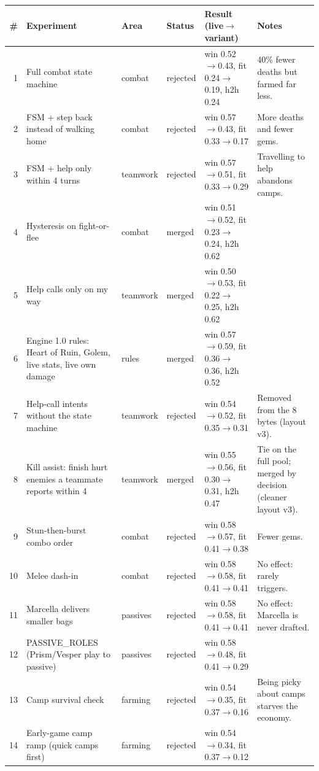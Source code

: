 \begin{xltabular}{\linewidth}{@{}rp{3.2cm}lp{1.3cm}p{4.3cm}X@{}}
\toprule
\# & Experiment & Area & Status & Result (live$\to$variant) & Notes\\
\midrule
{} & Full combat state machine & combat & rejected & win 0.52$\to$0.43, fit 0.24$\to$0.19, h2h 0.24 & 40\% fewer deaths but farmed far less.\\
2 & FSM + step back instead of walking home & combat & rejected & win 0.57$\to$0.43, fit 0.33$\to$0.17 & More deaths and fewer gems.\\
3 & FSM + help only within 4 turns & teamwork & rejected & win 0.57$\to$0.51, fit 0.33$\to$0.29 & Travelling to help abandons camps.\\
4 & Hysteresis on fight-or-flee & combat & merged & win 0.51$\to$0.52, fit 0.23$\to$0.24, h2h 0.62 & \\
5 & Help calls only on my way & teamwork & merged & win 0.50$\to$0.53, fit 0.22$\to$0.25, h2h 0.62 & \\
6 & Engine 1.0 rules: Heart of Ruin, Golem, live stats, live own damage & rules & merged & win 0.57$\to$0.59, fit 0.36$\to$0.36, h2h 0.52 & \\
7 & Help-call intents without the state machine & teamwork & rejected & win 0.54$\to$0.52, fit 0.35$\to$0.31 & Removed from the 8 bytes (layout v3).\\
8 & Kill assist: finish hurt enemies a teammate reports within 4 & teamwork & merged & win 0.55$\to$0.56, fit 0.30$\to$0.31, h2h 0.47 & Tie on the full pool; merged by decision (cleaner layout v3).\\
9 & Stun-then-burst combo order & combat & rejected & win 0.58$\to$0.57, fit 0.41$\to$0.38 & Fewer gems.\\
10 & Melee dash-in & combat & rejected & win 0.58$\to$0.58, fit 0.41$\to$0.41 & No effect: rarely triggers.\\
11 & Marcella delivers smaller bags & passives & rejected & win 0.58$\to$0.58, fit 0.41$\to$0.41 & No effect: Marcella is never drafted.\\
12 & PASSIVE\_ROLES (Prism/Vesper play to passive) & passives & rejected & win 0.58$\to$0.48, fit 0.41$\to$0.29 & \\
13 & Camp survival check & farming & rejected & win 0.54$\to$0.35, fit 0.37$\to$0.16 & Being picky about camps starves the economy.\\
14 & Early-game camp ramp (quick camps first) & farming & rejected & win 0.54$\to$0.34, fit 0.37$\to$0.12 & \\

\end{xltabular}
